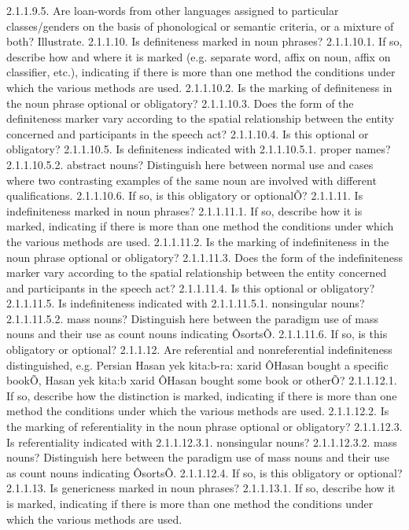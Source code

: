 2.1.1.9.5. Are loan-words from other languages assigned to particular classes/genders on the basis of phonological or semantic criteria, or a mixture of both? Illustrate.
2.1.1.10. Is definiteness marked in noun phrases?
2.1.1.10.1. If so, describe how and where it is marked (e.g. separate word, affix on noun, affix on classifier, etc.), indicating if there is more than one method the conditions under which the various methods are used.
2.1.1.10.2. Is the marking of definiteness in the noun phrase optional or obligatory?
2.1.1.10.3. Does the form of the definiteness marker vary according to the spatial relationship between the entity concerned and participants in the speech act?
2.1.1.10.4. Is this optional or obligatory?
2.1.1.10.5. Is definiteness indicated with
2.1.1.10.5.1. proper names?
2.1.1.10.5.2. abstract nouns?
Distinguish here between normal use and cases where two contrasting examples of the same noun are involved with different qualifications.
2.1.1.10.6. If so, is this obligatory or optionalÕ?
2.1.1.11. Is indefiniteness marked in noun phrases?
2.1.1.11.1. If so, describe how it is marked, indicating if there is more than one method the conditions under which the various methods are used.
2.1.1.11.2. Is the marking of indefiniteness in the noun phrase optional or obligatory?
2.1.1.11.3. Does the form of the indefiniteness marker vary according to the spatial relationship between the entity concerned and participants in the speech act?
2.1.1.11.4. Is this optional or obligatory?
2.1.1.11.5. Is indefiniteness indicated with
2.1.1.11.5.1. nonsingular nouns?
2.1.1.11.5.2. mass nouns?
Distinguish here between the paradigm use of mass nouns and their use as count nouns indicating ÔsortsÕ.
2.1.1.11.6. If so, is this obligatory or optional?
2.1.1.12. Are referential and nonreferential indefiniteness distinguished, e.g. Persian Hasan yek kita:b-ra: xarid ÔHasan bought a specific bookÕ, Hasan yek kita:b xarid ÔHasan bought some book or otherÕ?
2.1.1.12.1. If so, describe how the distinction is marked, indicating if there is more than one method the conditions under which the various methods are used.
2.1.1.12.2. Is the marking of referentiality in the noun phrase optional or obligatory?
2.1.1.12.3. Is referentiality indicated with
2.1.1.12.3.1. nonsingular nouns?
2.1.1.12.3.2. mass nouns?
Distinguish here between the paradigm use of mass nouns and their use as count nouns indicating ÔsortsÕ.
2.1.1.12.4. If so, is this obligatory or optional?
2.1.1.13. Is genericness marked in noun phrases?
2.1.1.13.1. If so, describe how it is marked, indicating if there is more than one method the conditions under which the various methods are used.

